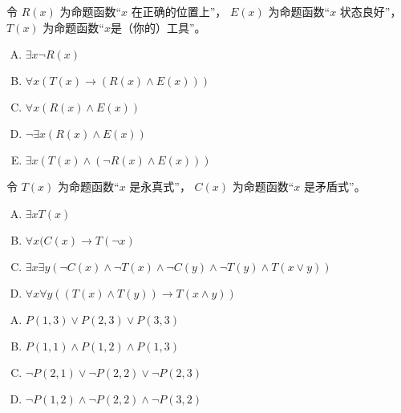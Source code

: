 {{        %
        \begin{practices}
            令 $R(x)$ 为命题函数``$x$ 在正确的位置上''， $E(x)$ 为命题函数``$x$ 状态良好''， $T(x)$ 为命题函数``$x$是（你的）工具''。
            \begin{enumerate}[A.]
                \item $\exists x \neg R(x)$
                \item $\forall x (T(x) \rightarrow (R(x) \wedge E(x)))$
                \item $\forall x (R(x) \wedge E(x))$
                \item $\neg \exists x (R(x) \wedge E(x))$
                \item $\exists x (T(x) \wedge (\neg R(x) \wedge E(x)))$
            \end{enumerate}
        \end{practices}

        \begin{practices}
            令 $T(x)$ 为命题函数``$x$ 是永真式''， $C(x)$ 为命题函数``$x$ 是矛盾式''。
            \begin{enumerate}[A.]
                \item $\exists x T(x)$
                \item $\forall x (C(x) \rightarrow T(\neg x)$
                \item $\exists x \exists y (\neg C(x) \wedge \neg T(x) \wedge \neg C(y) \wedge \neg T(y) \wedge T(x \vee y))$
                \item $\forall x \forall y ((T(x) \wedge T(y)) \rightarrow T(x \wedge y))$
            \end{enumerate}
        \end{practices}

        \begin{practices}
            \begin{enumerate}[A.]
                \item $P(1, 3) \vee P(2, 3) \vee P(3, 3)$
                \item $P(1, 1) \wedge P(1, 2) \wedge P(1, 3)$
                \item $\neg P(2, 1) \vee \neg P(2, 2) \vee \neg P(2, 3)$
                \item $\neg P(1, 2) \wedge \neg P(2, 2) \wedge \neg P(3, 2)$
            \end{enumerate}
        \end{practices}

}}
